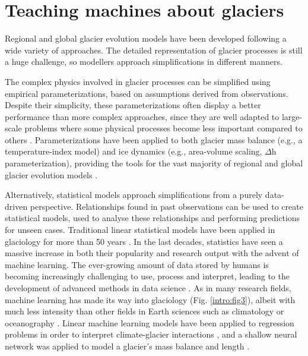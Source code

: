 \section{Teaching machines about glaciers}
\label{intro:ml}

Regional and global glacier evolution models have been developed following a wide variety of approaches. The detailed representation of glacier processes is still a huge challenge, so modellers approach simplifications in different manners. 

The complex physics involved in glacier processes can be simplified using empirical parameterizations, based on assumptions derived from observations. Despite their simplicity, these parameterizations often display a better performance than more complex approaches, since they are well adapted to large-scale problems where some physical processes become less important compared to others \citep{reveillet_relative_2018}. Parameterizations have been applied to both glacier mass balance (e.g., a temperature-index model) and ice dynamics (e.g., area-volume scaling, $\Delta$h parameterization), providing the tools for the vast majority of regional and global glacier evolution models \citep[e.g.,][]{marzeion_past_2012, huss_new_2015, maussion_open_2019, hock_glaciermip_2019}.

Alternatively, statistical models approach simplifications from a purely data-driven perspective. Relationships found in past observations can be used to create statistical models, used to analyse these relationships and performing predictions for unseen cases. Traditional linear statistical models have been applied in glaciology for more than 50 years \citep{hoinkes_glacier_1968, martin_correlation_1974}. In the last decades, statistics have seen a massive increase in both their popularity and research output with the advent of machine learning. The ever-growing amount of data stored by humans is becoming increasingly challenging to use, process and interpret, leading to the development of advanced methods in data science \citep{mjolsness_machine_2001}. As in many research fields, machine learning has  made its way into glaciology (Fig.  \ref{intro:fig3}), albeit with much less intensity than other fields in Earth sciences such as climatology \citep[e.g.,][]{liu_application_2016,ham_deep_2019,jiang_deep_2018} or oceanography \citep[e.g.,][]{ducournau_deep_2016,lguensat_learning_2019}. Linear machine learning models have been applied to regression problems in order to interpret climate-glacier interactions \citep{maussion_enso_2015}, and a shallow neural network was applied to model a glacier's mass balance and length \citep{steiner_application_2005,steiner_sensitivity_2008}. 


